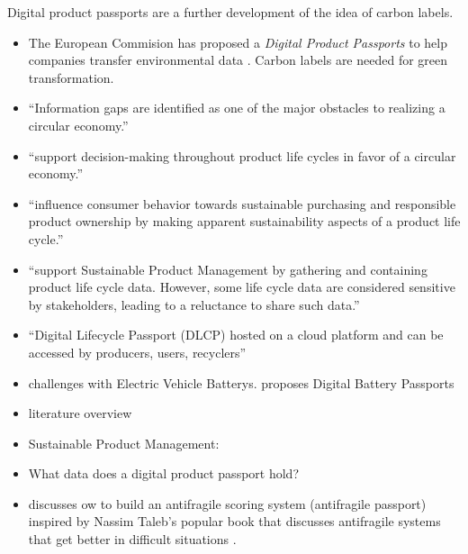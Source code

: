 \documentclass[
  letterpaper,
  DIV=11,
  numbers=noendperiod]{scrartcl}
\begin{document}
Digital product passports are a further development of the idea of
carbon labels.

\begin{itemize}
\item
  The European Commision has proposed a \emph{Digital Product Passports}
  to help companies transfer environmental data
  \citep{nissinenMakeCarbonFootprints2022}. Carbon labels are needed for
  green transformation.
\item
  \citet{reichDefiningGoalsProduct2023} ``Information gaps are
  identified as one of the major obstacles to realizing a circular
  economy.''
\item
  \citet{jensenDigitalProductPassports2023} ``support decision-making
  throughout product life cycles in favor of a circular economy.''
\item
  \citet{kingProposedUniversalDefinition2023} ``influence consumer
  behavior towards sustainable purchasing and responsible product
  ownership by making apparent sustainability aspects of a product life
  cycle.''
\item
  \citet{bergerConfidentialitypreservingDataExchange2023} ``support
  Sustainable Product Management by gathering and containing product
  life cycle data. However, some life cycle data are considered
  sensitive by stakeholders, leading to a reluctance to share such
  data.''
\item
  \citet{plociennikDigitalLifecyclePassport2022} ``Digital Lifecycle
  Passport (DLCP) hosted on a cloud platform and can be accessed by
  producers, users, recyclers''
\item
  \citet{bergerFactorsDigitalProduct2023} challenges with Electric
  Vehicle Batterys. \citet{bergerDataRequirementsAvailabilities2023}
  proposes Digital Battery Passports
\item
  \citet{vancapelleveenAnatomyPassportCircular2023} literature overview
\item
  Sustainable Product Management:
  \citet{korzhovaSustainableProductManagement2020}
\item
  What data does a digital product passport hold?
  \citet{tiandaphneWhatDataGoes2023}
\item
  \citet{gitcoinpassport2023} discusses ow to build an antifragile
  scoring system (antifragile passport) inspired by Nassim Taleb's
  popular book that discusses antifragile systems that get better in
  difficult situations \citep{talebAntifragileThingsThat2012}.
\end{itemize}
\end{document}
